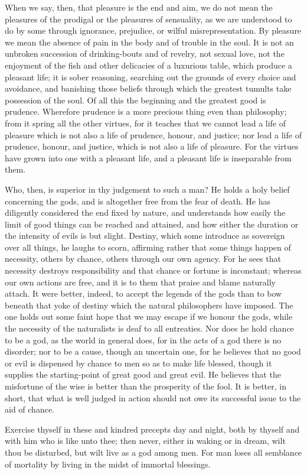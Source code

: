 \documentclass{stex}
\begin{document}
When we say, then, that pleasure is the end and aim, we do not mean the pleasures of the prodigal or the pleasures of sensuality, as we are understood to do by some through ignorance, prejudice, or wilful misrepresentation.
By pleasure we mean the absence of pain in the body and of trouble in the soul.
It is not an unbroken succession of drinking-bouts and of revelry, not sexual love, not the enjoyment of the fish and other delicacies of a luxurious table, which produce a pleasant life; it is sober reasoning, searching out the grounds of every choice and avoidance, and banishing those beliefs through which the greatest tumults take possession of the soul.
Of all this the beginning and the greatest good is prudence.
Wherefore prudence is a more precious thing even than philosophy; from it spring all the other virtues, for it teaches that we cannot lead a life of pleasure which is not also a life of prudence, honour, and justice; nor lead a life of prudence, honour, and justice, which is not also a life of pleasure.
For the virtues have grown into one with a pleasant life, and a pleasant life is inseparable from them.

Who, then, is superior in thy judgement to such a man? He holds a holy belief concerning the gods, and is altogether free from the fear of death.
He has diligently considered the end fixed by nature, and understands how easily the limit of good things can be reached and attained, and how either the duration or the intensity of evils is but slight.
Destiny, which some introduce as sovereign over all things, he laughs to scorn, affirming rather that some things happen of necessity, others by chance, others through our own agency.
For he sees that necessity destroys responsibility and that chance or fortune is inconstant; whereas our own actions are free, and it is to them that praise and blame naturally attach.
It were better, indeed, to accept the legends of the gods than to bow beneath that yoke of destiny which the natural philosophers have imposed.
The one holds out some faint hope that we may escape if we honour the gods, while the necessity of the naturalists is deaf to all entreaties.
Nor does he hold chance to be a god, as the world in general does, for in the acts of a god there is no disorder; nor to be a cause, though an uncertain one, for he believes that no good or evil is dispensed by chance to men so as to make life blessed, though it supplies the starting-point of great good and great evil.
He believes that the misfortune of the wise is better than the prosperity of the fool.
It is better, in short, that what is well judged in action should not owe its successful issue to the aid of chance.

Exercise thyself in these and kindred precepts day and night, both by thyself and with him who is like unto thee; then never, either in waking or in dream, wilt thou be disturbed, but wilt live as a god among men.
For man loses all semblance of mortality by living in the midst of immortal blessings.
\end{document}
